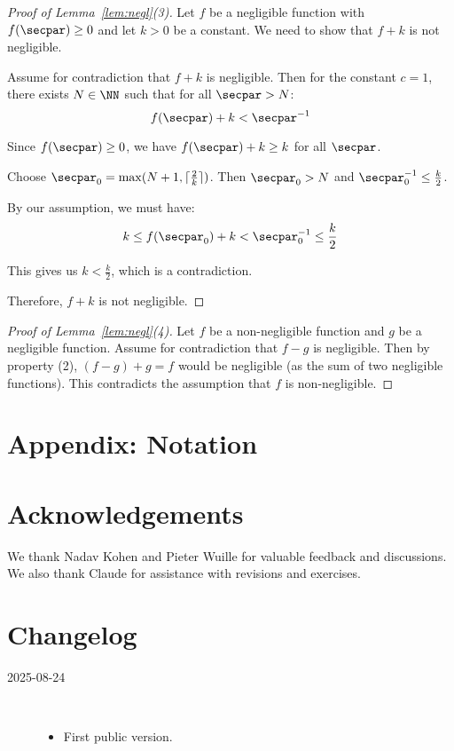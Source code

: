 \documentclass[
  a4paper,
  orivec,oribibl]{llncs}
\begin{document}
\begin{proof}[Proof of Lemma~\ref{lem:negl}(3)]
  Let $f$ be a negligible function with $f(\secpar) \ge 0$ and let $k > 0$ be a constant.
  We need to show that $f + k$ is not negligible.
  
  Assume for contradiction that $f + k$ is negligible. 
  Then for the constant $c = 1$, there exists $N \in \NN$ such that for all $\secpar > N$:
  \[
    f(\secpar) + k < \secpar^{-1}
  \]
  
  Since $f(\secpar) \ge 0$, we have $f(\secpar) + k \ge k$ for all $\secpar$.
  
  Choose $\secpar_0 = \max(N + 1, \lceil \frac{2}{k} \rceil)$. Then $\secpar_0 > N$ and $\secpar_0^{-1} \le \frac{k}{2}$.
  
  By our assumption, we must have:
  \[
    k \le f(\secpar_0) + k < \secpar_0^{-1} \le \frac{k}{2}
  \]
  
  This gives us $k < \frac{k}{2}$, which is a contradiction.
  
  Therefore, $f + k$ is not negligible.
\end{proof}

\begin{proof}[Proof of Lemma~\ref{lem:negl}(4)]
  Let $f$ be a non-negligible function and $g$ be a negligible function.
  Assume for contradiction that $f - g$ is negligible.
  Then by property (2), $(f - g) + g = f$ would be negligible (as the sum of two negligible functions).
  This contradicts the assumption that $f$ is non-negligible.
\end{proof}

\section{Appendix: Notation}\label{sec:appendix-notation}

\section*{Acknowledgements}
We thank Nadav Kohen and Pieter Wuille for valuable feedback and discussions.
We also thank Claude for assistance with revisions and exercises.

\iffull

  \section*{Changelog}\label{sec:changelog}
  \begin{description}
    \item[2025-08-24]\
          \begin{itemize}
            \item First public version.
          \end{itemize}
  \end{description}
  \vspace{-2em}
\fi

{}
\printbibliography\label{sec:bib}
\end{document}
